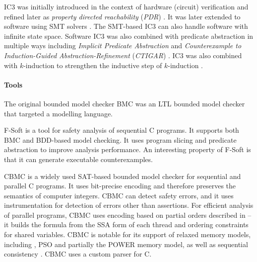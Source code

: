 IC3 was initially introduced in the context of hardware (circuit) verification  and refined later as \emph{property directed reachability} (\emph{PDR}) .
It was later extended to software using SMT solvers .
The SMT-based IC3 can also handle software with infinite state space.
Software IC3 was also combined with predicate abstraction in multiple ways including \emph{Implicit Predicate Abstraction}  and \emph{Counterexample to Induction-Guided Abstraction-Refinement} (\emph{CTIGAR}) .
IC3 was also combined with $k$-induction to strengthen the inductive step of $k$-induction .

\paragraph{Tools}

The original bounded model checker BMC  was an LTL bounded
model checker that targeted a modelling language.

F-Soft  is a tool for safety analysis of sequential C programs.
It supports both BMC and BDD-based model checking.
It uses program slicing and predicate abstraction to improve analysis performance.
An interesting property of F-Soft is that it can generate executable counterexamples.

CBMC  is a widely used SAT-based bounded
model checker for sequential and parallel C programs.
It uses bit-precise encoding and therefore preserves the semantics of computer
integers.
CBMC can detect safety errors, and it uses instrumentation for detection of
errors other than assertions.
For efficient analysis of parallel programs, CBMC uses encoding based on
partial orders described in  -- it builds the formula from
the SSA form of each thread and ordering constraints for shared variables.
CBMC is notable for its support of relaxed memory models, including \xtso,
PSO and partially the POWER memory model, as well as sequential consistency
.
CBMC uses a custom parser for C.

